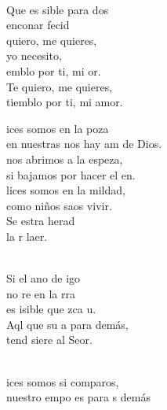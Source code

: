 \documentclass[12pt]{article}
\begin{document}
\begin{multicols*}{2}
\begin{cancion}
	\jump\\
	Que es sible para dos \\
	enconar fecid\\
	quiero, me quieres,\\
	yo  necesito,\\
	emblo por ti, mi or.\\
Te quiero, me quieres,\\
tiemblo por ti, mi amor.\\
\end{cancion}%

\begin{cancion}[Bienaventuranzas][Kairoi]%
	ices somos en la poza\\
	en nuestras nos hay am de Dios.\\
	nos abrimos a la espeza,\\
	si bajamos por hacer el en.\\
	lices somos en la mildad,\\
	como niños saos vivir.\\
	Se estra herad\\
	la r laer.\\\jump\\
	\begin{chorus}%
	Si el ano de igo \\
	no re en la rra\\
	es isible que zca u.\\
	Aql que  su a para  demás,\\
	tend siere al Seor.\\
	\end{chorus}%
	\jump\\
	ices somos si comparos,\\
	nuestro empo es para s demás\\

\end{cancion}
\end{multicols*}
\end{document}
